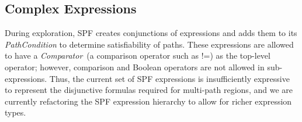 \subsection{Complex Expressions}
During exploration, SPF creates conjunctions of expressions and adds them to its {\em PathCondition} to determine satisfiability of paths.
%
These expressions are allowed to have a \textit{Comparator}~(a comparison operator such as !=) as the top-level operator; however, comparison and Boolean operators are not allowed in sub-expressions.  Thus, the current set of SPF expressions is insufficiently expressive to represent the disjunctive formulas required for multi-path regions, and we are currently refactoring the SPF expression hierarchy to allow for richer expression types.
%
%
%
